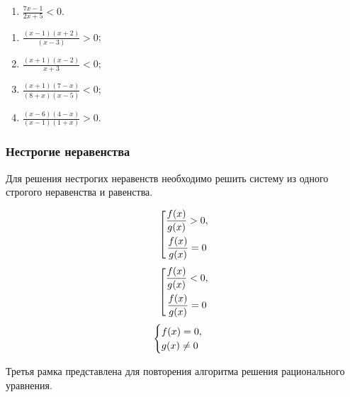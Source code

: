 \documentclass[algebra,twocolumn]{pum}
\newenvironment{sqcases}{%
  \left[
    \begin{gathered}
}{%
    \end{gathered}
  \right.
}
\begin{document}
\begin{exercises}
\begin{question}
\begin{multicols}{2}
\begin{enumerate}
    \item $\frac{7x-1}{2x+5}<0$.
  \end{enumerate}
\end{multicols}
\end{question}
\begin{question}
  \vspace{-24pt}
  \begin{multicols}{2}
  \begin{enumerate}
    \item $\frac{(x-1)(x+2)}{(x-3)}>0$;
    \item $\frac{(x+1)(x-2)}{x+3}<0$;
    \item $\frac{(x+1)(7-x)}{(8+x)(x-5)}<0$;
    \item $\frac{(x-6)(4-x)}{(x-1)(1+x)}>0$.
  \end{enumerate}
  \end{multicols}
\end{question}
\end{exercises}


\subsubsection*{Нестрогие неравенства}
Для решения нестрогих неравенств необходимо решить систему из одного строгого неравенства и равенства.
\begin{tcbitemize}[raster columns=3,raster equal height=rows, raster every box/.style={center title}]
  \tcbitem[squeezed title={$\frac{f(x)}{g(x)}\ge0$}]
  \vspace{-0.5cm}
  \begin{equation*}
    \begin{sqcases}
      \frac{f(x)}{g(x)}>0,\\ \frac{f(x)}{g(x)}=0
    \end{sqcases} \\
  \end{equation*}
  \tcbitem[squeezed title={$\frac{f(x)}{g(x)}\le0$}]
  \vspace{-0.5cm}
  \begin{equation*}
    \begin{sqcases}
      \frac{f(x)}{g(x)}<0,\\ \frac{f(x)}{g(x)}=0
    \end{sqcases} \\
  \end{equation*}
  \tcbitem[squeezed title={$\frac{f(x)}{g(x)}=0$}]
  \vspace{-0.5cm}
  \begin{equation*}
    \begin{cases}
      f(x)=0,\\ g(x)\ne0
    \end{cases} \\
  \end{equation*}
\end{tcbitemize}
Третья рамка представлена для повторения алгоритма решения рационального уравнения.
\end{document}
